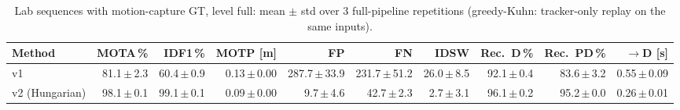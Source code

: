 \begin{table}[t]
\centering
\caption{Lab sequences with motion-capture GT, level full: mean $\pm$ std over 3 full-pipeline repetitions (greedy-Kuhn: tracker-only replay on the same inputs).}
\label{tab:own_r9_full_reps}
\setlength{\tabcolsep}{3pt}
\begin{tabular}{lrrrrrrrrr}
\toprule
Method & MOTA\,\% & IDF1\,\% & MOTP [m] & FP & FN & IDSW & Rec.\ D\,\% & Rec.\ PD\,\% & $\to$D [s] \\
\midrule
v1 & 81.1\,$\pm$\,2.3 & 60.4\,$\pm$\,0.9 & 0.13\,$\pm$\,0.00 & 287.7\,$\pm$\,33.9 & 231.7\,$\pm$\,51.2 & 26.0\,$\pm$\,8.5 & 92.1\,$\pm$\,0.4 & 83.6\,$\pm$\,3.2 & 0.55\,$\pm$\,0.09 \\
v2 (Hungarian) & 98.1\,$\pm$\,0.1 & 99.1\,$\pm$\,0.1 & 0.09\,$\pm$\,0.00 & 9.7\,$\pm$\,4.6 & 42.7\,$\pm$\,2.3 & 2.7\,$\pm$\,3.1 & 96.1\,$\pm$\,0.2 & 95.2\,$\pm$\,0.0 & 0.26\,$\pm$\,0.01 \\
\bottomrule
\end{tabular}
\end{table}
